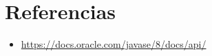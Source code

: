 \documentclass{article}
\begin{document}
\clearpage
\section{Referencias}
\begin{itemize}			
    \item \url{https://docs.oracle.com/javase/8/docs/api/}
\end{itemize}	
  
\end{document}
